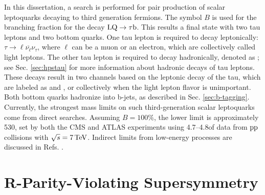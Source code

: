 In this dissertation, a search is performed for pair production of scalar leptoquarks decaying to third generation fermions. The symbol $B$ is used for the branching fraction for the decay $\text{LQ} \rightarrow \tau \mathrm{b}$. This results a final state with two tau leptons and two bottom quarks. One tau lepton is required to decay leptonically: $\tau \rightarrow \ell \overline{\nu_{\ell}} \nu_{\tau}$, where $\ell$ can be a muon or an electron, which are collectively called light leptons. The other tau lepton is required to decay hadronically, denoted as \tauh; see Sec. \ref{sec:hpstau} for more information about hadronic decays of tau leptons. These decays result in two channels based on the leptonic decay of the tau, which are labeled as \etau and \mutau, or collectively \ltau when the light lepton flavor is unimportant. Both bottom quarks hadronize into b-jets, as described in Sec. \ref{sec:b-tagging}. Currently, the strongest mass limits on such third-generation scalar leptoquarks come from direct searches. Assuming $B=100\%$, the lower limit is approximately 530\GeV, set by both the CMS \cite{CMSLQ3} and ATLAS \cite{ATLASLQ3} experiments using 4.7--4.8\fbinv of data from $\mathrm{p}\mathrm{p}$ collisions with $\sqrt{s}=7\,\text{Te\hspace{-.08em}V}$. Indirect limits from low-energy processes are discussed in Refs. \cite{ModelIndLQ,Leurer:1993em, MuchAdo, LQreview}.


\section{R-Parity-Violating Supersymmetry}